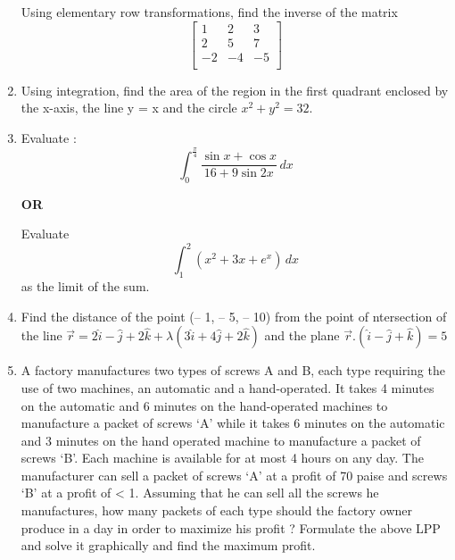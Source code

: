 \documentclass{exam}
\begin{document}
\begin{enumerate}
     Using elementary row transformations, find the inverse of the matrix
     $$\begin{bmatrix}
     1 & 2 & 3 \\
     2 & 5 & 7 \\
     -2 & -4 & -5 \\
     \end{bmatrix} $$
     
     \item Using integration, find the area of the region in the first quadrant enclosed by the x-axis, the line y = x and the circle $x^{2} + y^{2} = 32$.
     
     \item Evaluate :
     $$ \int_{0}^{\frac{\pi}{4}} \frac{\sin x + \cos x}{16 + 9\sin 2x} \,dx $$
     
     \begin{center}
     \textbf{OR}
     \end{center}
     
     Evaluate
     $$ \int_{1}^{2} (x^{2} + 3x + e^{x}) \,dx $$
     as the limit of the sum.
     
     \item Find the distance of the point (– 1, – 5, – 10) from the point of ntersection of the line $\vec{r} = 2\hat{i} - \hat{j} + 2\hat{k} +\lambda(3\hat{i} + 4\hat{j} + 2\hat{k})$ and the plane $\vec{r}$.$(\hat{i} - \hat{j} + \hat{k}) = 5$
     
     \item A factory manufactures two types of screws A and B, each type requiring the use of two machines, an automatic and a hand-operated. It takes 4 minutes on the automatic and 6 minutes on the hand-operated machines to manufacture a packet of screws ‘A’ while it takes 6 minutes
on the automatic and 3 minutes on the hand operated machine to manufacture a packet of screws ‘B’. Each machine is available for at most
4 hours on any day. The manufacturer can sell a packet of screws ‘A’ at a profit of 70 paise and screws ‘B’ at a profit of < 1. Assuming that he can sell all the screws he manufactures, how many packets of each type should the factory owner produce in a day in order to maximize his profit ? Formulate the above LPP and solve it graphically and find the maximum profit.
     
    
    
     
     
     
     \end{enumerate}
     
\end{document}
